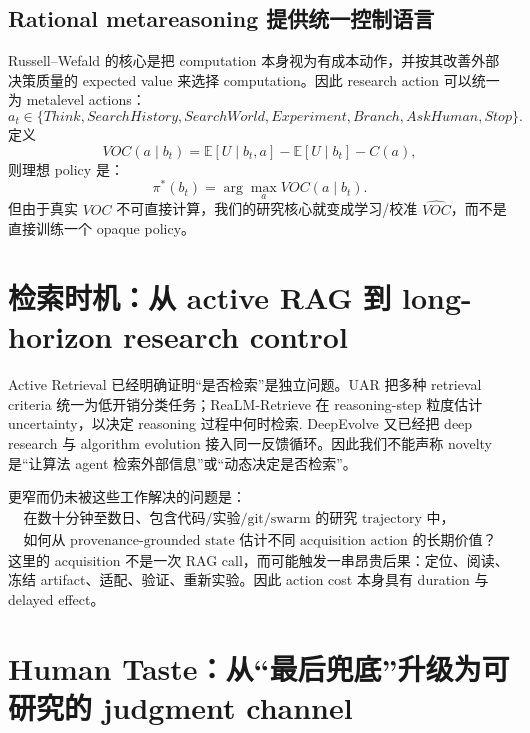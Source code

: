 \documentclass[11pt,a4paper]{ctexart}
\begin{document}
\subsection{Rational metareasoning 提供统一控制语言}

Russell--Wefald 的核心是把 computation 本身视为有成本动作，并按其改善外部决策质量的 expected value 来选择 computation\cite{russell1991meta}。因此 research action 可以统一为 metalevel actions：
\begin{equation}
 a_t\in\{Think,SearchHistory,SearchWorld,Experiment,Branch,AskHuman,Stop\}.
\end{equation}
定义
\begin{equation}
 VOC(a\mid b_t)=\mathbb E[U\mid b_t,a]-\mathbb E[U\mid b_t]-C(a),
\end{equation}
则理想 policy 是：
\begin{equation}
\pi^*(b_t)=\arg\max_a VOC(a\mid b_t).
\end{equation}
但由于真实 $VOC$ 不可直接计算，我们的研究核心就变成学习/校准 $\widehat{VOC}$，而不是直接训练一个 opaque policy。

\section{检索时机：从 active RAG 到 long-horizon research control}

Active Retrieval 已经明确证明“是否检索”是独立问题。UAR 把多种 retrieval criteria 统一为低开销分类任务\cite{cheng2024uar}；ReaLM-Retrieve 在 reasoning-step 粒度估计 uncertainty，以决定 reasoning 过程中何时检索\cite{guo2026realm}. DeepEvolve 又已经把 deep research 与 algorithm evolution 接入同一反馈循环\cite{liu2025deepevolve}。因此我们不能声称 novelty 是“让算法 agent 检索外部信息”或“动态决定是否检索”。

更窄而仍未被这些工作解决的问题是：
\begin{equation}
\boxed{\begin{gathered}
\text{在数十分钟至数日、包含代码/实验/git/swarm 的研究 trajectory 中，}\\
\text{如何从 provenance-grounded state 估计不同 acquisition action 的长期价值？}
\end{gathered}}
\end{equation}
这里的 acquisition 不是一次 RAG call，而可能触发一串昂贵后果：定位、阅读、冻结 artifact、适配、验证、重新实验。因此 action cost 本身具有 duration 与 delayed effect。

\section{Human Taste：从“最后兜底”升级为可研究的 judgment channel}
\end{document}
